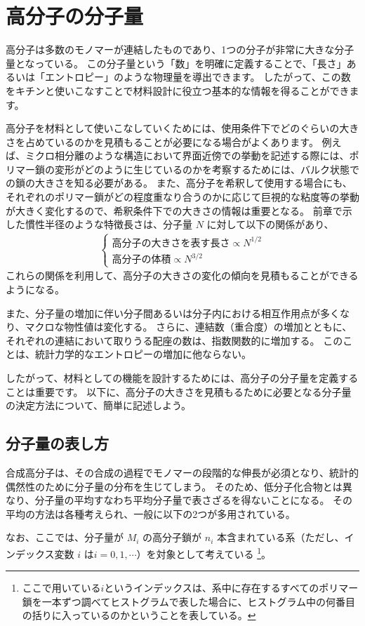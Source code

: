 \documentclass[a4paper,11pt]{jlreq}
\begin{document}
\section{高分子の分子量}
高分子は多数のモノマーが連結したものであり、1つの分子が非常に大きな分子量となっている。
この分子量という「数」を明確に定義することで、「長さ」あるいは「エントロピー」のような物理量を導出できます。
したがって、この数をキチンと使いこなすことで材料設計に役立つ基本的な情報を得ることができます。

高分子を材料として使いこなしていくためには、使用条件下でどのぐらいの大きさを占めているのかを見積もることが必要になる場合がよくあります。
例えば、ミクロ相分離のような構造において界面近傍での挙動を記述する際には、ポリマー鎖の変形がどのように生じているのかを考察するためには、バルク状態での鎖の大きさを知る必要がある。
また、高分子を希釈して使用する場合にも、それぞれのポリマー鎖がどの程度重なり合うのかに応じて巨視的な粘度等の挙動が大きく変化するので、希釈条件下での大きさの情報は重要となる。
前章で示した慣性半径のような特徴長さは、分子量 $N$ に対して以下の関係があり、
\begin{align*}
\begin{cases}
\text{高分子の大きさを表す長さ} \propto N^{1/2} \\[8pt]
\text{高分子の体積} \propto N^{3/2}
\end{cases}
\end{align*}
これらの関係を利用して、高分子の大きさの変化の傾向を見積もることができるようになる。

また、分子量の増加に伴い分子間あるいは分子内における相互作用点が多くなり、マクロな物性値は変化する。
さらに、連結数（重合度）の増加とともに、それぞれの連結において取りうる配座の数は、指数関数的に増加する。
このことは、統計力学的なエントロピーの増加に他ならない。

したがって、材料としての機能を設計するためには、高分子の分子量を定義することは重要です。
以下に、高分子の大きさを見積もるために必要となる分子量の決定方法について、簡単に記述しよう。


\subsection{分子量の表し方}
合成高分子は、その合成の過程でモノマーの段階的な伸長が必須となり、統計的偶然性のために分子量の分布を生じてしまう。
そのため、低分子化合物とは異なり、分子量の平均すなわち平均分子量で表さざるを得ないことになる。
その平均の方法は各種考えられ、一般に以下の2つが多用されている。

なお、ここでは、分子量が $M_i$ の高分子鎖が $n_i$ 本含まれている系（ただし、インデックス変数 $i$ は$i=0,1,\cdots$）を対象として考えている
\footnote
{
ここで用いている$i$というインデックスは、系中に存在するすべてのポリマー鎖を一本ずつ調べてヒストグラムで表した場合に、ヒストグラム中の何番目の括りに入っているのかということを表している。
}。
\end{document}
